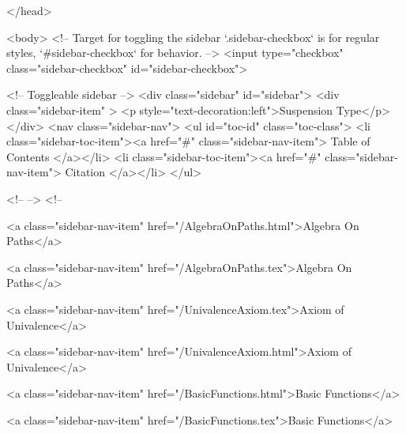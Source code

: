   
</head>




  <body>
    <!-- Target for toggling the sidebar `.sidebar-checkbox` is for regular
     styles, `#sidebar-checkbox` for behavior. -->
<input type="checkbox" class="sidebar-checkbox" id="sidebar-checkbox">

<!-- Toggleable sidebar -->
<div class="sidebar" id="sidebar">
  <div class="sidebar-item" >
    <p style="text-decoration:left">Suspension Type</p>
  </div>
  <nav class="sidebar-nav">
    <ul id="toc-id" class="toc-class">
  <li class="sidebar-toc-item"><a href="#" class="sidebar-nav-item"> Table of Contents </a></li>
  <li class="sidebar-toc-item"><a href="#" class="sidebar-nav-item"> Citation </a></li>
</ul>


    <!--  -->
    <!-- 
      
    
      
    
      
    
      
        
      
    
      
        
          <a class="sidebar-nav-item" href="/AlgebraOnPaths.html">Algebra On Paths</a>
        
      
    
      
        
          <a class="sidebar-nav-item" href="/AlgebraOnPaths.tex">Algebra On Paths</a>
        
      
    
      
        
          <a class="sidebar-nav-item" href="/UnivalenceAxiom.tex">Axiom of Univalence</a>
        
      
    
      
        
          <a class="sidebar-nav-item" href="/UnivalenceAxiom.html">Axiom of Univalence</a>
        
      
    
      
        
          <a class="sidebar-nav-item" href="/BasicFunctions.html">Basic Functions</a>
        
      
    
      
        
          <a class="sidebar-nav-item" href="/BasicFunctions.tex">Basic Functions</a>
        
      
    
      
        
